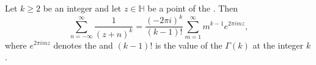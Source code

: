 \begin{theorem}
\label{theorem:lipschitz_summation_formula_for_reciprocal_powers_on_the_upper_half_plane}
Let $k \geq 2$ be an integer and let $z \in \mathbb{H}$ be a point of the . Then
$$\sum_{n=-\infty}^{\infty} \frac{1}{(z+n)^k} = \frac{(-2\pi i)^k}{(k-1)!} \sum_{m=1}^{\infty} m^{k-1} e^{2\pi i m z},$$
where $e^{2\pi i m z}$ denotes the  and $(k-1)!$ is the value of the  $\Gamma(k)$ at the integer $k$.
\end{theorem}

